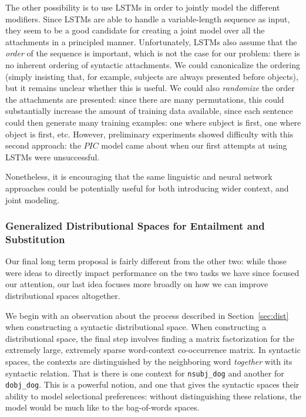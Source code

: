 \documentclass[letterpaper]{article}
\begin{document}
The other possibility is to use LSTMs in order to jointly model the different
modifiers. Since LSTMs are able to handle a variable-length sequence as input,
they seem to be a good candidate for creating a joint model over all the
attachments in a principled manner. Unfortunately, LSTMs also assume that the
{\em order} of the sequence is important, which is not the case for our problem:
there is no inherent ordering of syntactic attachments. We could canonicalize
the ordering (simply insisting that, for example, subjects are always presented
before objects), but it remains unclear whether this is useful. We could also
{\em randomize} the order the attachments are presented: since there are many
permutations, this could substantially increase the amount of training data
available, since each sentence could then generate many training examples: one
where subject is first, one where object is first, etc. However, preliminary
experiments showed difficulty with this second approach: the $PIC$ model came
about when our first attempts at using LSTMs were unsuccessful.

Nonetheless, it is encouraging that the same linguistic and neural network
approaches could be potentially useful for both introducing wider context,
and joint modeling.

\subsubsection{Generalized Distributional Spaces for Entailment and Substitution}

Our final long term proposal is fairly different from the other two: while
those were ideas to directly impact performance on the two tasks we have
since focused our attention, our last idea focuses more broadly on how
we can improve distributional spaces altogether.

We begin with an observation about the process described in
Section~\ref{sec:dist} when constructing a syntactic distributional space.
When constructing a distributional space, the final step involves finding a
matrix factorization for the extremely large, extremely sparse word-context
co-occurrence matrix. In syntactic spaces, the contexts are distinguished by
the neighboring word {\em together} with its syntactic relation. That is there
is one context for {\tt nsubj\_dog} and another for {\tt dobj\_dog}. This is a
powerful notion, and one that gives the syntactic spaces their ability
to model selectional preferences: without distinguishing these relations,
the model would be much like to the bag-of-words spaces.
\end{document}
